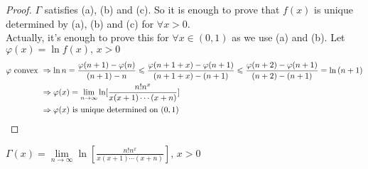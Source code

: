   \begin{proof}
     $ \Gamma  $ satisfies (a), (b) and (c). So it is enough to prove that  $ f(x) $ is unique determined by (a), (b) and (c) for  $ \forall x>0 $.\\
     Actually, it's enough to prove this for  $ \forall x\in(0,1) $ as we use (a) and (b).
     Let  $ \varphi(x)=\ln{f(x)},\,x>0 $
     \begin{align*}
        \varphi \text{ convex }&\Rightarrow \ln{n }=\frac{\varphi(n+1)-\varphi(n)}{(n+1)-n} \leqslant 
        \frac{\varphi(n+1+x)-\varphi(n+1)}{(n+1+x)-(n+1)} \leqslant \frac{\varphi(n+2)-\varphi(n+1)}{(n+2)-(n+1)}=\ln{(n+1)}\\
        &\Rightarrow \varphi(x)=\lim\limits_{n\to\infty } \ln[\frac{n!n^x }{x(x+1)\cdots(x+n)}]\\
        &\Rightarrow\varphi(x) \text{ is unique determined on  $ (0,1) $ } 
     \end{align*}   
  \end{proof}
  \begin{corollary}
     $ \Gamma(x)=\lim\limits_{n\to\infty} \ln[\frac{n!n^x }{x(x+1)\cdots(x+n)}],\,x>0 $ 
  \end{corollary}